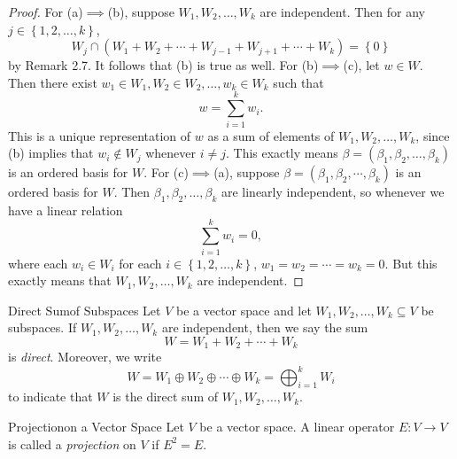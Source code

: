 \documentclass[linearalgebraII]{subfiles}
\begin{document}
    \begin{proof}
        For (a)$\implies$(b), suppose $W_1, W_2, \ldots, W_k$ are independent. Then for any $j\in \left\lbrace 1, 2, \ldots, k \right\rbrace$, 
        \begin{equation*}
            W_j\cap \left( W_1+W_2+\cdots+W_{j-1}+W_{j+1}+\cdots+W_k \right) = \left\lbrace 0 \right\rbrace 
        \end{equation*}
        by Remark 2.7. It follows that (b) is true as well. For (b)$\implies$(c), let $w\in W$. Then there exist $w_1\in W_1, W_2\in W_2, \ldots, w_k\in W_k$ such that
        \begin{equation*}
            w = \sum^{k}_{i=1} w_i.
        \end{equation*}
        This is a unique representation of $w$ as a sum of elements of $W_1, W_2, \ldots, W_k$, since (b) implies that $w_i\notin W_j$ whenever $i\neq j$. This exactly means $\beta = \left( \beta_1, \beta_2, \ldots, \beta_k \right)$ is an ordered basis for $W$. For (c)$\implies$(a), suppose $\beta = \left( \beta_1, \beta_2, \cdots, \beta_k \right)$ is an ordered basis for $W$. Then $\beta_1, \beta_2, \ldots, \beta_k$ are linearly independent, so whenever we have a linear
        relation
        \begin{equation*}
            \sum^{k}_{i=1} w_i = 0,
        \end{equation*}
        where each $w_i\in W_i$ for each $i\in \left\lbrace 1, 2, \ldots, k \right\rbrace$, $w_1 = w_2 = \cdots = w_k = 0$. But this exactly means that $W_1, W_2, \ldots, W_k$ are independent.
    \end{proof}

    \begin{definition}{Direct Sum}{of Subspaces}
        Let $V$ be a vector space and let $W_1, W_2, \ldots, W_k\subseteq V$ be subspaces. If $W_1, W_2, \ldots, W_k$ are independent, then we say the sum
        \begin{equation*}
            W = W_1 + W_2 + \cdots + W_k
        \end{equation*}
        is \emph{direct}. Moreover, we write
        \begin{equation*}
            W = W_1\oplus W_2\oplus \cdots\oplus W_k = \bigoplus^{k}_{i=1} W_i
        \end{equation*}
        to indicate that $W$ is the direct sum of $W_1, W_2, \ldots, W_k$.
    \end{definition}

    \begin{definition}{Projection}{on a Vector Space}
        Let $V$ be a vector space. A linear operator $E:V\to V$ is called a \emph{projection} on $V$ if $E^2 = E$.
    \end{definition}
\end{document}
